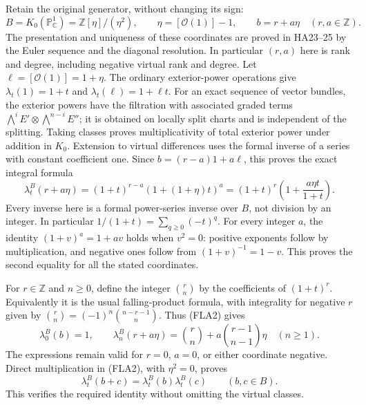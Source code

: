 Retain the original generator, without changing its sign:
\begin{equation}\tag{FLA1}
 B=K_0(\mathbb P^1_{\mathbb C})
       =\mathbb Z[\eta]/(\eta^2),\qquad
 \eta=[\mathcal O(1)]-1,
 \qquad b=r+a\eta\quad(r,a\in\mathbb Z).
\end{equation}
The presentation and uniqueness of these coordinates are proved in
HA23--25 by the Euler sequence and the diagonal resolution. In
particular $(r,a)$ here is rank and degree, including negative
virtual rank and degree. Let $\ell=[\mathcal O(1)]=1+\eta$.
The ordinary exterior-power operations give
$\lambda_t(1)=1+t$ and $\lambda_t(\ell)=1+\ell t$.
For an exact sequence of vector bundles, the exterior powers have
the filtration with associated graded terms
$\bigwedge^i E'\otimes\bigwedge^{n-i}E''$; it is obtained on
locally split charts and is independent of the splitting. Taking
classes proves multiplicativity of total exterior power under
addition in $K_0$. Extension to virtual differences uses the formal
inverse of a series with constant coefficient one. Since
$b=(r-a)1+a\ell$, this proves the exact integral formula
\begin{equation}\tag{FLA2}
 \lambda_t^B(r+a\eta)
  =(1+t)^{r-a}(1+(1+\eta)t)^a
  =(1+t)^r\left(1+\frac{a\eta t}{1+t}\right).
\end{equation}
Every inverse here is a formal power-series inverse over $B$,
not division by an integer. In particular $1/(1+t)=\sum_{q\ge0}
(-t)^q$. For every integer $a$, the identity $(1+v)^a=1+av$
holds when $v^2=0$: positive exponents follow by multiplication,
and negative ones follow from $(1+v)^{-1}=1-v$. This proves the
second equality for all the stated coordinates.

For $r\in\mathbb Z$ and $n\ge0$, define the integer
$\binom rn$ by the coefficients of $(1+t)^r$. Equivalently it
is the usual falling-product formula, with integrality for negative
$r$ given by $\binom rn=(-1)^n\binom{n-r-1}{n}$. Thus (FLA2)
gives
\begin{equation}\tag{FLA3}
 \lambda_0^B(b)=1,\qquad
 \lambda_n^B(r+a\eta)=
 \binom rn+a\binom{r-1}{n-1}\eta\quad(n\ge1).
\end{equation}
The expressions remain valid for $r=0$, $a=0$, or either coordinate
negative. Direct multiplication in (FLA2), with $\eta^2=0$, proves
\begin{equation}\tag{FLA4}
 \lambda_t^B(b+c)=\lambda_t^B(b)\lambda_t^B(c)
                    \qquad(b,c\in B).
\end{equation}
This verifies the required identity without omitting the virtual
classes.

